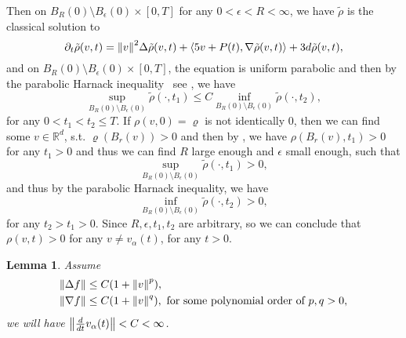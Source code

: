 \documentclass[a4paper, 11pt]{article}
\newcommand{\inner}[2]{\left< #1 , #2 \right>}
\newcounter{results}[section]
\theoremstyle{plain}
\newtheorem{lemma}[results]{Lemma}
\theoremstyle{remark}
\theoremstyle{definition}
\begin{document}
Then on $B_R(0)\setminus B_{\epsilon}(0)\times [0,T]$ for any $0<\epsilon<R<\infty$, we have $\tilde{\rho}$ is the classical solution to 
\begin{equation}
\partial_t\tilde{\rho}(v,t)=\norm{v}^2\Delta\tilde{\rho}(v,t)+\inner{5v+P(t)}{\nabla\tilde{\rho}(v,t)}+3d\tilde{\rho}(v,t),
\end{equation}
and on $B_R(0)\setminus B_{\epsilon}(0)\times [0,T]$, the equation is uniform parabolic and then by the parabolic Harnack inequality~ see \cite[Section 7.1, Theorem 10]{evans2022partial}, we have
\begin{equation}
\sup_{B_R(0)\setminus B_{\epsilon}(0)} \tilde{\rho}(\cdot,t_1)\leq C\inf_{B_R(0)\setminus B_{\epsilon}(0)} \tilde{\rho}(\cdot,t_2),
\end{equation}
for any $0<t_1<t_2\leq T$. If $\rho(v,0)=\varrho$ is not identically $0$, then we can find some $v\in \mathbb{R}^d$, s.t. $\varrho(B_r(v))>0$ and then by \cite[Proposition 23]{B1-fornasier2021global}, we have $\rho(B_r(v),t_1)>0$ for any $t_1>0$ and thus we can find $R$ large enough and $\epsilon$ small enough, such that
\begin{equation}
\sup_{B_R(0)\setminus B_{\epsilon}(0)} \tilde{\rho}(\cdot,t_1)>0,
\end{equation}
and thus by the parabolic Harnack inequality, we have
\begin{equation}
\inf_{B_R(0)\setminus B_{\epsilon}(0)} \tilde{\rho}(\cdot,t_2)>0,
\end{equation}
for any $t_2>t_1>0$. Since $R,\epsilon,t_1,t_2$ are arbitrary, so we can conclude that $\rho(v,t)>0$ for any $v\not= v_\alpha(t)$, for any $t>0$.

\begin{lemma}\label{lem:g211}
Assume 
\begin{equation}\label{condition:ff}
    \begin{aligned}
        &\norm{\Delta f}\leq C(1+\norm{v}^p),\\
        &\norm{\nabla f}\leq C(1+\norm{v}^q),\text{ for some polynomial order of $p,q>0$},
    \end{aligned}
\end{equation}
we will have $\norm{\frac{d}{dt}v_{\alpha}(t)}<C<\infty$.
\end{lemma}
\end{document}
